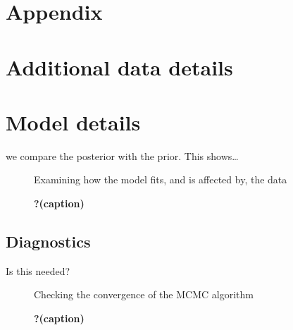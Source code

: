 \documentclass[
  letterpaper,
  DIV=11,
  numbers=noendperiod]{scrartcl}
\begin{document}
\appendix

\hypertarget{sec-appendix}{%
\section{Appendix}\label{sec-appendix}}

\hypertarget{additional-data-details}{%
\section{Additional data details}\label{additional-data-details}}

\hypertarget{sec-model-details}{%
\section{Model details}\label{sec-model-details}}

we compare the posterior with the prior. This shows\ldots{}

\begin{figure}

\begin{minipage}[t]{0.50\linewidth}

{\centering 

Examining how the model fits, and is affected by, the data

}

\end{minipage}%

\caption{\label{fig-ppcheckandposteriorvsprior}\textbf{?(caption)}}

\end{figure}

\hypertarget{diagnostics}{%
\subsection{Diagnostics}\label{diagnostics}}

Is this needed?

\begin{figure}

\begin{minipage}[t]{0.50\linewidth}

{\centering 

Checking the convergence of the MCMC algorithm

}

\end{minipage}%

\caption{\label{fig-stanareyouokay}\textbf{?(caption)}}

\end{figure}
\end{document}
